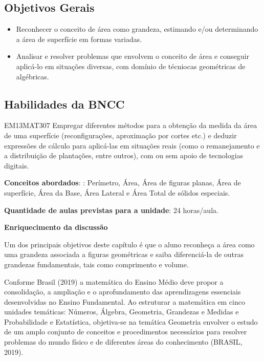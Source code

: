 \begin{apresentacao}
\section{Objetivos Gerais}
\begin{itemize}
\item Reconhecer o conceito de área como grandeza, estimando e/ou determinando a área de superfície em formas variadas.
\item Analisar e resolver problemas que envolvem o conceito de área e conseguir aplicá-lo em situações diversas, com domínio de técniocas geométricas de algébricas.
\end{itemize}

\subsection{Habilidades da BNCC}
\begin{habilities}{EM13MAT307}
Empregar diferentes métodos para a obtenção da medida da área de uma superfície (reconfigurações, aproximação por cortes etc.) e deduzir expressões de cálculo para aplicá-las em situações reais (como o remanejamento e a distribuição de plantações, entre outros), com ou sem apoio de tecnologias digitais.
\end{habilities}

\textbf{Conceitos abordados}: : Perímetro, Área, Área de figuras planas, Área de superfície, Área da Base, Área Lateral e Área Total de sólidos especiais.

\textbf{Quantidade de aulas previstas para a unidade}: 24 horas/aula.

\textbf{Enriquecimento da discussão}

Um dos principais objetivos deste capítulo é que o aluno reconheça a área como uma grandeza associada a figuras geométricas e saiba diferenciá-la de outras grandezas fundamentais, tais como comprimento e volume. 

Conforme Brasil (2019) a matemática do Ensino Médio deve propor a consolidação, a ampliação e o aprofundamento das aprendizagens essenciais desenvolvidas no Ensino Fundamental. Ao estruturar a matemática em cinco unidades temáticas: Números, Álgebra, Geometria, Grandezas e Medidas e Probabilidade e Estatística, objetiva-se na temática Geometria envolver o estudo de um amplo conjunto de conceitos e procedimentos necessários para resolver problemas do mundo físico e de diferentes áreas do conhecimento (BRASIL, 2019).


\end{apresentacao}
